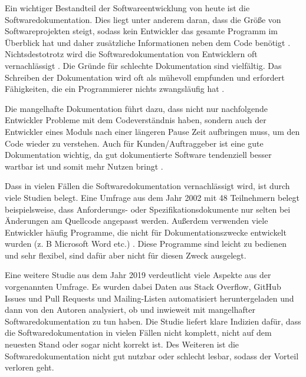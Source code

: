 \label{sec:introduction}

Ein wichtiger Bestandteil der Softwareentwicklung von heute ist die Softwaredokumentation. Dies liegt unter anderem daran, dass die Größe von Softwareprojekten steigt, sodass kein Entwickler das gesamte Programm im Überblick hat und daher zusätzliche Informationen neben dem Code benötigt \cite[S. 1]{StaticAnalysis:AnIntroduction:TheFundamentalChallengeofSoftwareEngineeringisOneofComplexity.}. Nichtsdestotrotz wird die Softwaredokumentation von Entwicklern oft vernachlässigt \cite[S. 83]{Qualityanalysisofsourcecodecomments}.  Die Gründe für schlechte Dokumentation sind vielfältig. Das Schreiben der Dokumentation wird oft als mühevoll empfunden und erfordert Fähigkeiten, die ein Programmierer nichts zwangsläufig hat\cite[S. 70]{AutomaticQualityAssessmentofSourceCodeComments:TheJavadocMiner} \cite[S. 593]{Softwareengineeringandsoftwaredocumentation:aunifiedlongcourse}.  

Die mangelhafte Dokumentation führt dazu, dass nicht nur nachfolgende Entwickler Probleme mit dem Codeverständnis haben, sondern auch der Entwickler eines Moduls nach einer längeren Pause Zeit aufbringen muss, um den Code wieder zu verstehen. \cite[S. 286]{Fakhoury2018} Auch für Kunden/Auftraggeber ist eine gute Dokumentation wichtig, da gut dokumentierte Software tendenziell besser wartbar ist und somit mehr Nutzen bringt \cite[S. 83]{Qualityanalysisofsourcecodecomments}\cite[S. 1]{SoftwareDocumentationManagementIssuesandPractices:ASurvey}.


Dass in vielen Fällen die Softwaredokumentation vernachlässigt wird, ist durch viele Studien belegt. Eine Umfrage aus dem Jahr 2002 mit 48 Teilnehmern belegt beispielsweise, dass Anforderungs- oder Spezifikationsdokumente nur selten bei Änderungen am Quellcode angepasst werden. Außerdem verwenden viele Entwickler häufig Programme, die nicht für Dokumentationszwecke entwickelt wurden (z. B Microsoft Word etc.) \cite[S. 28-29]{TheRelevanceofSoftwareDocumentationToolsandTechnologies:ASurvey}. Diese Programme sind leicht zu bedienen und sehr flexibel, sind dafür aber nicht für diesen Zweck ausgelegt. 

Eine weitere Studie aus dem Jahr 2019 verdeutlicht viele Aspekte aus der vorgenannten Umfrage. Es wurden dabei Daten aus Stack Overflow, GitHub Issues und Pull Requests und Mailing-Listen automatisiert heruntergeladen und dann von den Autoren analysiert, ob und inwieweit mit mangelhafter Softwaredokumentation zu tun haben.  Die Studie liefert klare Indizien dafür, dass die Softwaredokumentation in vielen Fällen nicht komplett, nicht auf dem neuesten Stand oder sogar nicht korrekt ist. Des Weiteren ist die Softwaredokumentation nicht gut nutzbar oder schlecht lesbar, sodass der Vorteil verloren geht\cite[S.1201 -1204]{SoftwareDocumentationIssuesUnveiled}.







